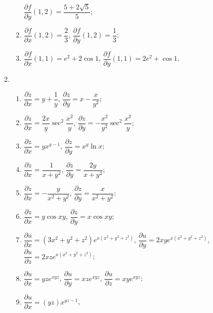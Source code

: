 \begin{enumerate}
\begin{enumerate}[(1)]
                $\dfrac{\partial{f}}{\partial{y}}(1,2) = \dfrac{5 + 2\sqrt{5}}{5}$;
            \item %
                $\dfrac{\partial{f}}{\partial{x}}(1,2) = \dfrac23$,
                $\dfrac{\partial{f}}{\partial{y}}(1,2) = \dfrac13$;
            \item %
                $\dfrac{\partial{f}}{\partial{x}}(1,1) = e^2 + 2\cos{1}$,
                $\dfrac{\partial{f}}{\partial{y}}(1,1) = 2e^2 + \cos{1}$.
        \end{enumerate}
    \item %
        \begin{enumerate}[(1)]
            \item %
                $\dfrac{\partial{z}}{\partial{x}} = y + \dfrac1y$,
                $\dfrac{\partial{z}}{\partial{y}} = x - \dfrac{x}{y^2}$;
            \item %
                $\dfrac{\partial{z}}{\partial{x}} = \dfrac{2x}{y}\sec^2\dfrac{x^2}{y}$,
                $\dfrac{\partial{z}}{\partial{y}} = -\dfrac{x^2}{y^2}\sec^2\dfrac{x^2}{y}$;
            \item %
                $\dfrac{\partial{z}}{\partial{x}} = yx^{y-1}$,
                $\dfrac{\partial{z}}{\partial{y}} = x^y\ln{x}$;
            \item %
                $\dfrac{\partial{z}}{\partial{x}} = \dfrac{1}{x + y^2}$,
                $\dfrac{\partial{z}}{\partial{y}} = \dfrac{2y}{x + y^2}$;
            \item %
                $\dfrac{\partial{z}}{\partial{x}} = -\dfrac{y}{x^2 + y^2}$,
                $\dfrac{\partial{z}}{\partial{y}} = \dfrac{x}{x^2 + y^2}$;
            \item %
                $\dfrac{\partial{z}}{\partial{x}} = y\cos{xy}$,
                $\dfrac{\partial{z}}{\partial{y}} = x\cos{xy}$;
            \item %
                $\dfrac{\partial{u}}{\partial{x}} = (3x^2+y^2+z^2)e^{x(x^2+y^2+z^2)}$,
                $\dfrac{\partial{u}}{\partial{y}} = 2xye^{x(x^2+y^2+z^2)}$,
                $\dfrac{\partial{u}}{\partial{z}} = 2xze^{x(x^2+y^2+z^2)}$;
            \item %
                $\dfrac{\partial{u}}{\partial{x}}=yze^{xyz}$,
                $\dfrac{\partial{u}}{\partial{y}}=xze^{xyz}$,
                $\dfrac{\partial{u}}{\partial{z}}=xye^{xyz}$;
            \item %
                $\dfrac{\partial{u}}{\partial{x}} = (yz)x^{yz-1}$,

\end{enumerate}
\end{enumerate}
